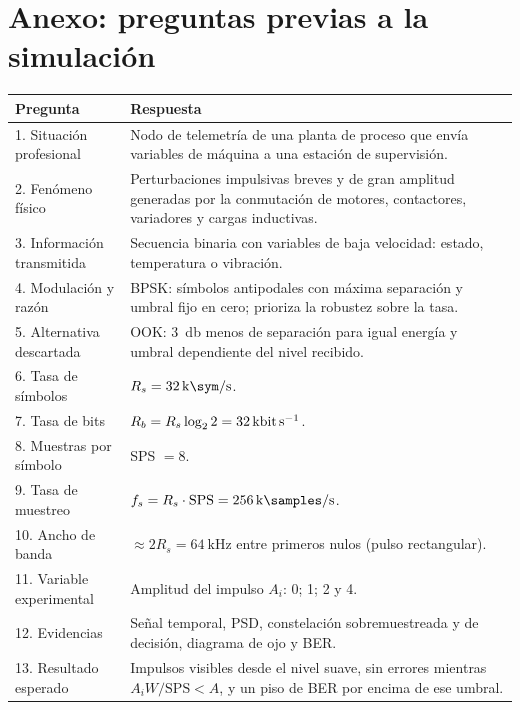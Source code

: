 \section*{Anexo: preguntas previas a la simulación}\label{sec:anexo}
\noindent\begin{minipage}{\columnwidth}
\centering
{}
\label{tab:preguntas}
\scriptsize
\setlength{\tabcolsep}{3pt}
\begin{tabular}{@{}p{}p{}@{}}
\toprule
\textbf{Pregunta} & \textbf{Respuesta} \\
\midrule
1. Situación profesional & Nodo de telemetría de una planta de proceso que envía variables de máquina a una estación de supervisión. \\
2. Fenómeno físico & Perturbaciones impulsivas breves y de gran amplitud generadas por la conmutación de motores, contactores, variadores y cargas inductivas. \\
3. Información transmitida & Secuencia binaria con variables de baja velocidad: estado, temperatura o vibración. \\
4. Modulación y razón & BPSK: símbolos antipodales con máxima separación y umbral fijo en cero; prioriza la robustez sobre la tasa. \\
5. Alternativa descartada & OOK: \SI{3}{\decibel} menos de separación para igual energía y umbral dependiente del nivel recibido. \\
6. Tasa de símbolos & $R_s=\SI{32}{\kilo\sym\per\second}$. \\
7. Tasa de bits & $R_b=R_s\log_2 2=\SI{32}{\kilo\bit\per\second}$. \\
8. Muestras por símbolo & SPS $=8$. \\
9. Tasa de muestreo & $f_s=R_s\cdot\mathrm{SPS}=\SI{256}{\kilo\samples\per\second}$. \\
10. Ancho de banda & $\approx 2R_s=\SI{64}{\kilo\hertz}$ entre primeros nulos (pulso rectangular). \\
11. Variable experimental & Amplitud del impulso $A_i$: 0; 1; 2 y 4. \\
12. Evidencias & Señal temporal, PSD, constelación sobremuestreada y de decisión, diagrama de ojo y BER. \\
13. Resultado esperado & Impulsos visibles desde el nivel suave, sin errores mientras $A_iW/\mathrm{SPS}<A$, y un piso de BER por encima de ese umbral. \\
\bottomrule
\end{tabular}
\end{minipage}

